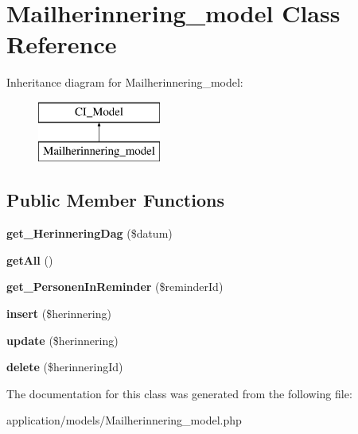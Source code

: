 \hypertarget{class_mailherinnering__model}{}\section{Mailherinnering\+\_\+model Class Reference}
\label{class_mailherinnering__model}
Inheritance diagram for Mailherinnering\+\_\+model\+:\begin{figure}[H]
\begin{center}
\leavevmode
\includegraphics[height=2.000000cm]{class_mailherinnering__model}
\end{center}
\end{figure}
\subsection*{Public Member Functions}
\begin{DoxyCompactItemize}
\item 
\mbox{\label{class_mailherinnering__model_a29819479620b67d93965786bce00b695}} 
{\bfseries get\+\_\+\+Herinnering\+Dag} (\$datum)
\item 
\mbox{\label{class_mailherinnering__model_aba0d5b303383fb5b1fabb5fd01cd3800}} 
{\bfseries get\+All} ()
\item 
\mbox{\label{class_mailherinnering__model_a4c031458f8607c8960792706ce49f3ab}} 
{\bfseries get\+\_\+\+Personen\+In\+Reminder} (\$reminder\+Id)
\item 
\mbox{\label{class_mailherinnering__model_a1ffebfb064147228f479c1d0b83ac50d}} 
{\bfseries insert} (\$herinnering)
\item 
\mbox{\label{class_mailherinnering__model_a33e5747900292af47d92a2fd6ba4d484}} 
{\bfseries update} (\$herinnering)
\item 
\mbox{\label{class_mailherinnering__model_aa4b59888d725b40a291f7e241fe60203}} 
{\bfseries delete} (\$herinnering\+Id)
\end{DoxyCompactItemize}


The documentation for this class was generated from the following file\+:\begin{DoxyCompactItemize}
\item 
application/models/Mailherinnering\+\_\+model.\+php\end{DoxyCompactItemize}
